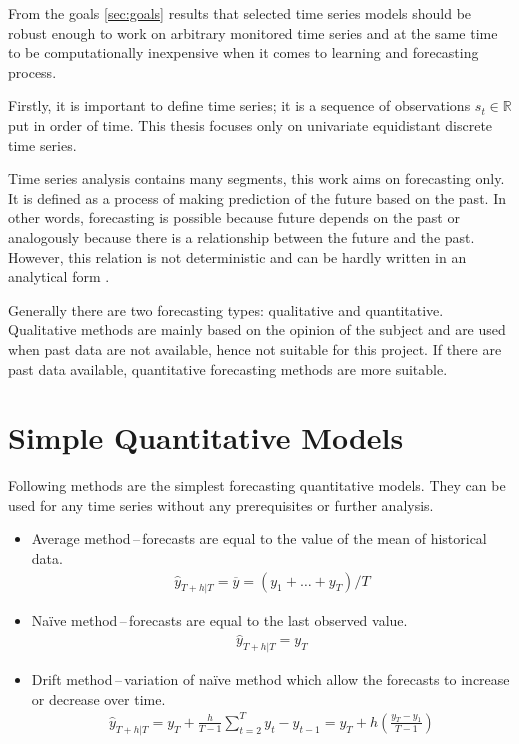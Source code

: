From the goals \ref{sec:goals} results that selected time series models should be robust enough to work on arbitrary
monitored time series and at the same time to be computationally inexpensive when it comes to learning and forecasting
process.

Firstly, it is important to define time series; it is a sequence of observations $s_t \in \mathbb{R}$ put in order of
time. This thesis focuses only on univariate equidistant discrete time series.

Time series analysis contains many segments, this work aims on forecasting only. It is defined as a process of making
prediction of the future based on the past. In other words, forecasting is possible because future depends on the
past or analogously because there is a relationship between the future and the past. However, this relation is not
deterministic and can be hardly written in an analytical form \cite{otexts}.

Generally there are two forecasting types: qualitative and quantitative. Qualitative methods are mainly based on the
opinion of the subject and are used when past data are not available, hence not suitable for this project. If there
are past data available, quantitative forecasting methods are more suitable.

    \section{Simple Quantitative Models} \label{sec:simple-models}
    Following methods are the simplest forecasting quantitative models. They can be used for any time series without
    any prerequisites or further analysis.

    \begin{itemize}
        \item Average method\,--\,forecasts are equal to the value of the mean of historical data.
            \begin{eqnarray}
                \hat{y}_{T+h|T} = \overline{y} = (y_{1}+ \dots + y_{T}) / T 
            \end{eqnarray}
        \item Na\"{i}ve method\,--\,forecasts are equal to the last observed value.
            \begin{eqnarray}
                \hat{y}_{T+h|T} = y_{T}
            \end{eqnarray}
        \item Drift method\,--\,variation of na\"{i}ve method which allow the forecasts to increase or decrease
            over time.
            \begin{eqnarray}
                \hat{y}_{T+h|T} = y_{T} + \frac{h}{T-1} \sum_{t=2}^T{y_{t} - y_{t-1}} = 
                    y_{T} + h(\frac{y_{T}-y_{1}}{T-1}) 
            \end{eqnarray}
    \end{itemize}

